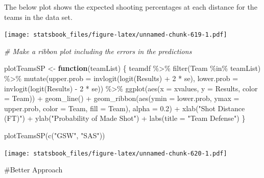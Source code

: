 \documentclass[
]{book}
\newenvironment{Shaded}{\begin{snugshade}}{\end{snugshade}}
\newcommand{\AttributeTok}[1]{\textcolor[rgb]{0.77,0.63,0.00}{#1}}
\newcommand{\CommentTok}[1]{\textcolor[rgb]{0.56,0.35,0.01}{\textit{#1}}}
\newcommand{\ControlFlowTok}[1]{\textcolor[rgb]{0.13,0.29,0.53}{\textbf{#1}}}
\newcommand{\DecValTok}[1]{\textcolor[rgb]{0.00,0.00,0.81}{#1}}
\newcommand{\FloatTok}[1]{\textcolor[rgb]{0.00,0.00,0.81}{#1}}
\newcommand{\FunctionTok}[1]{\textcolor[rgb]{0.00,0.00,0.00}{#1}}
\newcommand{\NormalTok}[1]{#1}
\newcommand{\OtherTok}[1]{\textcolor[rgb]{0.56,0.35,0.01}{#1}}
\newcommand{\SpecialCharTok}[1]{\textcolor[rgb]{0.00,0.00,0.00}{#1}}
\newcommand{\StringTok}[1]{\textcolor[rgb]{0.31,0.60,0.02}{#1}}
\theoremstyle{definition}
\theoremstyle{definition}
\theoremstyle{definition}
\theoremstyle{definition}
\theoremstyle{remark}
\begin{document}
The below plot shows the expected shooting percentages at each distance for the teams in the data set.

\texttt{[image: statsbook\_files/figure-latex/unnamed-chunk-619-1.pdf]}

\begin{Shaded}
\begin{Highlighting}[]
\CommentTok{\# Make a ribbon plot including the errors in the predictions}

\NormalTok{plotTeamsSP }\OtherTok{\textless{}{-}} \ControlFlowTok{function}\NormalTok{(teamList) \{}
\NormalTok{    teamdf }\SpecialCharTok{\%\textgreater{}\%}
        \FunctionTok{filter}\NormalTok{(Team }\SpecialCharTok{\%in\%}\NormalTok{ teamList) }\SpecialCharTok{\%\textgreater{}\%}
        \FunctionTok{mutate}\NormalTok{(}\AttributeTok{upper.prob =} \FunctionTok{invlogit}\NormalTok{(}\FunctionTok{logit}\NormalTok{(Results) }\SpecialCharTok{+} \DecValTok{2} \SpecialCharTok{*}\NormalTok{ se), }\AttributeTok{lower.prob =} \FunctionTok{invlogit}\NormalTok{(}\FunctionTok{logit}\NormalTok{(Results) }\SpecialCharTok{{-}}
            \DecValTok{2} \SpecialCharTok{*}\NormalTok{ se)) }\SpecialCharTok{\%\textgreater{}\%}
        \FunctionTok{ggplot}\NormalTok{(}\FunctionTok{aes}\NormalTok{(}\AttributeTok{x =}\NormalTok{ xvalues, }\AttributeTok{y =}\NormalTok{ Results, }\AttributeTok{color =}\NormalTok{ Team)) }\SpecialCharTok{+} \FunctionTok{geom\_line}\NormalTok{() }\SpecialCharTok{+} \FunctionTok{geom\_ribbon}\NormalTok{(}\FunctionTok{aes}\NormalTok{(}\AttributeTok{ymin =}\NormalTok{ lower.prob,}
        \AttributeTok{ymax =}\NormalTok{ upper.prob, }\AttributeTok{color =}\NormalTok{ Team, }\AttributeTok{fill =}\NormalTok{ Team), }\AttributeTok{alpha =} \FloatTok{0.2}\NormalTok{) }\SpecialCharTok{+} \FunctionTok{xlab}\NormalTok{(}\StringTok{"Shot Distance (FT)"}\NormalTok{) }\SpecialCharTok{+}
        \FunctionTok{ylab}\NormalTok{(}\StringTok{"Probability of Made Shot"}\NormalTok{) }\SpecialCharTok{+} \FunctionTok{labs}\NormalTok{(}\AttributeTok{title =} \StringTok{"Team Defense"}\NormalTok{)}
\NormalTok{\}}

\FunctionTok{plotTeamsSP}\NormalTok{(}\FunctionTok{c}\NormalTok{(}\StringTok{"GSW"}\NormalTok{, }\StringTok{"SAS"}\NormalTok{))}
\end{Highlighting}
\end{Shaded}

\texttt{[image: statsbook\_files/figure-latex/unnamed-chunk-620-1.pdf]}

\#Better Approach
\end{document}
